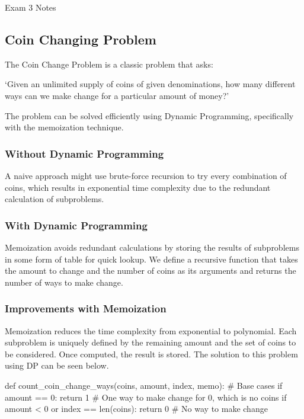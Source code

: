 \begin{examnotes}{Exam 3 Notes}
    \subsection*{Coin Changing Problem}

    The Coin Change Problem is a classic problem that asks: 
    
    `Given an unlimited supply of coins of given denominations, how many different ways can we make change for a particular amount of money?' 
    
    The problem can be solved efficiently using Dynamic Programming, specifically with the memoization technique.

    \subsubsection*{Without Dynamic Programming}

    A naive approach might use brute-force recursion to try every combination of coins, which results in exponential time complexity due to the redundant calculation of subproblems.

    \subsubsection*{With Dynamic Programming}

    Memoization avoids redundant calculations by storing the results of subproblems in some form of table for quick lookup. We define a recursive function that takes the amount to change and the number 
    of coins as its arguments and returns the number of ways to make change.

    \begin{highlight}
        \subsubsection*{Improvements with Memoization}

        Memoization reduces the time complexity from exponential to polynomial. Each subproblem is uniquely defined by the remaining amount and the set of coins to be considered. Once computed, the 
        result is stored. The solution to this problem using DP can be seen below.

    \begin{code}[Python]
    def count_coin_change_ways(coins, amount, index, memo):
        # Base cases
        if amount == 0:
            return 1  # One way to make change for 0, which is no coins
        if amount < 0 or index == len(coins):
            return 0  # No way to make change


\end{code}
\end{highlight}
\end{examnotes}
